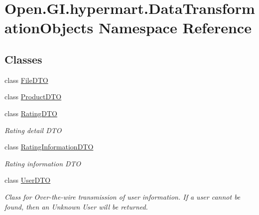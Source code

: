 \hypertarget{namespace_open_1_1_g_i_1_1hypermart_1_1_data_transformation_objects}{}\section{Open.\+G\+I.\+hypermart.\+Data\+Transformation\+Objects Namespace Reference}
\label{namespace_open_1_1_g_i_1_1hypermart_1_1_data_transformation_objects}
\subsection*{Classes}
\begin{DoxyCompactItemize}
\item 
class \hyperlink{class_open_1_1_g_i_1_1hypermart_1_1_data_transformation_objects_1_1_file_d_t_o}{File\+D\+TO}
\item 
class \hyperlink{class_open_1_1_g_i_1_1hypermart_1_1_data_transformation_objects_1_1_product_d_t_o}{Product\+D\+TO}
\item 
class \hyperlink{class_open_1_1_g_i_1_1hypermart_1_1_data_transformation_objects_1_1_rating_d_t_o}{Rating\+D\+TO}
\begin{DoxyCompactList}\small\item\em Rating detail D\+TO \end{DoxyCompactList}\item 
class \hyperlink{class_open_1_1_g_i_1_1hypermart_1_1_data_transformation_objects_1_1_rating_information_d_t_o}{Rating\+Information\+D\+TO}
\begin{DoxyCompactList}\small\item\em Rating information D\+TO \end{DoxyCompactList}\item 
class \hyperlink{class_open_1_1_g_i_1_1hypermart_1_1_data_transformation_objects_1_1_user_d_t_o}{User\+D\+TO}
\begin{DoxyCompactList}\small\item\em Class for Over-\/the-\/wire transmission of user information. If a user cannot be found, then an Unknown User will be returned. \end{DoxyCompactList}\end{DoxyCompactItemize}
